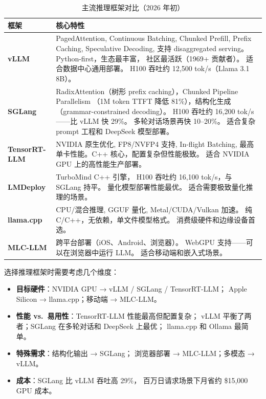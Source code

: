 \begin{table}[H]
\centering\small
\caption{主流推理框架对比（2026 年初）}
\begin{tabularx}{\linewidth}{l X}
\toprule
\textbf{框架} & \textbf{核心特性} \\
\midrule
\textbf{vLLM} & PagedAttention, Continuous Batching, Chunked Prefill, Prefix Caching,
  Speculative Decoding, 支持 disaggregated serving。Python-first，生态最丰富，
  社区最活跃（1969+ 贡献者）。
  适合数据中心通用部署。
  H100 吞吐约 12,500 tok/s（Llama 3.1 8B）。 \\
\textbf{SGLang} & RadixAttention（树形 prefix caching），Chunked Pipeline Parallelism
  （1M token TTFT 降低 81\%），结构化生成（grammar-constrained decoding）。
  H100 吞吐约 16,200 tok/s——比 vLLM 快 29\%。
  多轮对话场景再快 10--20\%。
  适合复杂 prompt 工程和 DeepSeek 模型部署。 \\
\textbf{TensorRT-LLM} & NVIDIA 原生优化, FP8/NVFP4 支持, In-flight Batching,
  最高单卡性能。C++ 核心，配置复杂但性能极致。
  适合 NVIDIA GPU 上的高性能生产部署。 \\
\textbf{LMDeploy} & TurboMind C++ 引擎，
  H100 吞吐约 16,100 tok/s，与 SGLang 持平。
  量化模型部署性能最优。
  适合需要极致量化推理的场景。 \\
\textbf{llama.cpp} & CPU/混合推理, GGUF 量化, Metal/CUDA/Vulkan 加速。
  纯 C/C++，无依赖，单文件模型格式。
  消费级硬件和边缘设备首选。 \\
\textbf{MLC-LLM} & 跨平台部署（iOS、Android、浏览器）。
  WebGPU 支持——可以在浏览器中运行 LLM。
  适合移动端和嵌入式场景。 \\
\bottomrule
\end{tabularx}
\end{table}

选择推理框架时需要考虑几个维度：
\begin{itemize}[noitemsep]
  \item \textbf{目标硬件}：NVIDIA GPU → vLLM / SGLang / TensorRT-LLM；
        Apple Silicon → llama.cpp；移动端 → MLC-LLM。
  \item \textbf{性能 vs.\ 易用性}：TensorRT-LLM 性能最高但配置复杂；
        vLLM 平衡了两者；SGLang 在多轮对话和 DeepSeek 上最优；
        llama.cpp 和 Ollama 最简单。
  \item \textbf{特殊需求}：结构化输出 → SGLang；
        浏览器部署 → MLC-LLM；多模态 → vLLM。
  \item \textbf{成本}：SGLang 比 vLLM 吞吐高 29\%，
        百万日请求场景下月省约 \$15,000 GPU 成本。
\end{itemize}

